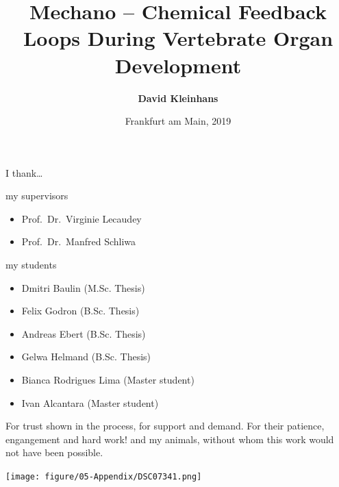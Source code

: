 \documentclass[11pt,singlespacinge,twoside]{reedthesis} %
\title{\textbf{Mechano -- Chemical Feedback Loops \linebreak During Vertebrate Organ Development}}
\author{\textbf{David Kleinhans}}
\date{Frankfurt am Main, 2019}
\providecommand{\tightlist}{%
  \setlength{\itemsep}{0pt}\setlength{\parskip}{0pt}}
\begin{document}

  \maketitle

\pagestyle{empty} %
  \begin{acknowledgements}
    I thank\ldots{}\newline
    
    \noindent my supervisors
    \begin{itemize}
    \tightlist
    \item
      Prof.~Dr.~Virginie Lecaudey
    \item
      Prof.~Dr.~Manfred Schliwa
    \end{itemize}
    \noindent my students
    \begin{itemize}
    \tightlist
    \item
      Dmitri Baulin (M.Sc. Thesis)
    \item
      Felix Godron (B.Sc. Thesis)
    \item
      Andreas Ebert (B.Sc. Thesis)
    \item
      Gelwa Helmand (B.Sc. Thesis)
    \item
      Bianca Rodrigues Lima (Master student)
    \item
      Ivan Alcantara (Master student)
    \end{itemize}
    For trust shown in the process, for support and demand. \newline For their patience, engangement and hard work!
    \newline\newline
    \noindent and my animals, without whom this work would not have been possible.
    \vspace{0.2cm}
    \begin{center}
      \texttt{[image: figure/05-Appendix/DSC07341.png]}
    \end{center}
  \end{acknowledgements}

  \hypersetup{linkcolor=black}
  \setcounter{tocdepth}{2}
  \tableofcontents

  \listoftables
\end{document}
